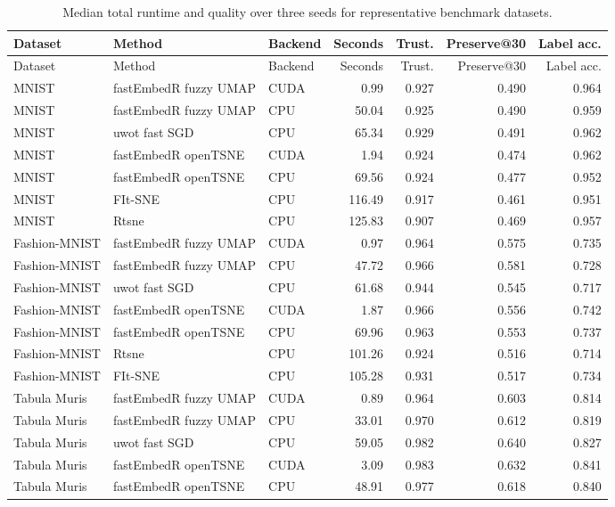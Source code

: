 {\footnotesize
\setlength{\tabcolsep}{3pt}
\begin{longtable}{p{}p{}lrrrr}
\caption{Median total runtime and quality over three seeds for representative benchmark datasets.}\label{tab:hpcquality}\\
\toprule
Dataset & Method & Backend & Seconds & Trust. & Preserve@30 & Label acc.\\
\midrule
\endfirsthead
\toprule
Dataset & Method & Backend & Seconds & Trust. & Preserve@30 & Label acc.\\
\midrule
\endhead
MNIST & fastEmbedR fuzzy UMAP & CUDA & 0.99 & 0.927 & 0.490 & 0.964\\
MNIST & fastEmbedR fuzzy UMAP & CPU & 50.04 & 0.925 & 0.490 & 0.959\\
MNIST & uwot fast SGD & CPU & 65.34 & 0.929 & 0.491 & 0.962\\
MNIST & fastEmbedR openTSNE & CUDA & 1.94 & 0.924 & 0.474 & 0.962\\
MNIST & fastEmbedR openTSNE & CPU & 69.56 & 0.924 & 0.477 & 0.952\\
MNIST & FIt-SNE & CPU & 116.49 & 0.917 & 0.461 & 0.951\\
MNIST & Rtsne & CPU & 125.83 & 0.907 & 0.469 & 0.957\\
Fashion-MNIST & fastEmbedR fuzzy UMAP & CUDA & 0.97 & 0.964 & 0.575 & 0.735\\
Fashion-MNIST & fastEmbedR fuzzy UMAP & CPU & 47.72 & 0.966 & 0.581 & 0.728\\
Fashion-MNIST & uwot fast SGD & CPU & 61.68 & 0.944 & 0.545 & 0.717\\
Fashion-MNIST & fastEmbedR openTSNE & CUDA & 1.87 & 0.966 & 0.556 & 0.742\\
Fashion-MNIST & fastEmbedR openTSNE & CPU & 69.96 & 0.963 & 0.553 & 0.737\\
Fashion-MNIST & Rtsne & CPU & 101.26 & 0.924 & 0.516 & 0.714\\
Fashion-MNIST & FIt-SNE & CPU & 105.28 & 0.931 & 0.517 & 0.734\\
Tabula Muris & fastEmbedR fuzzy UMAP & CUDA & 0.89 & 0.964 & 0.603 & 0.814\\
Tabula Muris & fastEmbedR fuzzy UMAP & CPU & 33.01 & 0.970 & 0.612 & 0.819\\
Tabula Muris & uwot fast SGD & CPU & 59.05 & 0.982 & 0.640 & 0.827\\
Tabula Muris & fastEmbedR openTSNE & CUDA & 3.09 & 0.983 & 0.632 & 0.841\\
Tabula Muris & fastEmbedR openTSNE & CPU & 48.91 & 0.977 & 0.618 & 0.840\\

\end{longtable}}
